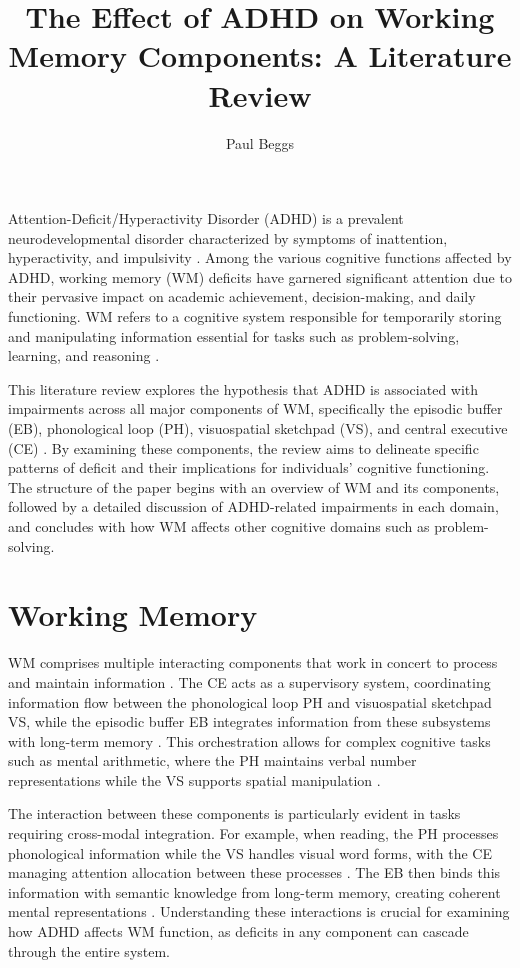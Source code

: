 \documentclass[stu]{apa7}
\title{The Effect of ADHD on Working Memory Components: A Literature Review}
\author{Paul Beggs}
\begin{document}
\maketitle

Attention-Deficit/Hyperactivity Disorder (ADHD) is a prevalent neurodevelopmental disorder characterized by symptoms of inattention, hyperactivity, and impulsivity \parencite{faraone_attention-deficithyperactivity_2015}. Among the various cognitive functions affected by ADHD, working memory (WM) deficits have garnered significant attention due to their pervasive impact on academic achievement, decision-making, and daily functioning. WM refers to a cognitive system responsible for temporarily storing and manipulating information essential for tasks such as problem-solving, learning, and reasoning \parencite{baddeley_working_2020}.

This literature review explores the hypothesis that ADHD is associated with impairments across all major components of WM, specifically the episodic buffer (EB), phonological loop (PH), visuospatial sketchpad (VS), and central executive (CE) \parencite{baddeley_developments_1994}. By examining these components, the review aims to delineate specific patterns of deficit and their implications for individuals' cognitive functioning. The structure of the paper begins with an overview of WM and its components, followed by a detailed discussion of ADHD-related impairments in each domain, and concludes with how WM affects other cognitive domains such as problem-solving.

\section{Working Memory}

WM comprises multiple interacting components that work in concert to process and maintain information \parencite{baddeley_working_2020}. The CE acts as a supervisory system, coordinating information flow between the phonological loop PH and visuospatial sketchpad VS, while the episodic buffer EB integrates information from these subsystems with long-term memory \parencite{baddeley_developments_1994}. This orchestration allows for complex cognitive tasks such as mental arithmetic, where the PH maintains verbal number representations while the VS supports spatial manipulation \parencite{kofler_working_2020}.

The interaction between these components is particularly evident in tasks requiring cross-modal integration. For example, when reading, the PH processes phonological information while the VS handles visual word forms, with the CE managing attention allocation between these processes \parencite{friedman_reading_2017}. The EB then binds this information with semantic knowledge from long-term memory, creating coherent mental representations \parencite{baddeley_working_2012}. Understanding these interactions is crucial for examining how ADHD affects WM function, as deficits in any component can cascade through the entire system.
\end{document}
